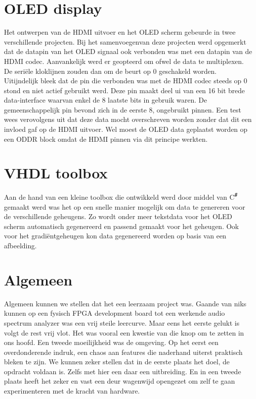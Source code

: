 	\section{OLED display}
		\par Het ontwerpen van de HDMI uitvoer en het OLED scherm gebeurde in twee verschillende projecten. Bij het samenvoegenvan deze projecten werd opgemerkt dat de datapin van het OLED signaal ook verbonden was met een datapin van de HDMI codec. Aanvankelijk werd er geopteerd om ofwel de data te multiplexen. De seri\"ele kloklijnen zouden dan om de beurt op 0 geschakeld worden. Uitijndelijk bleek dat de pin die verbonden was met de HDMI codec steeds op 0 stond en niet actief gebruikt werd. Deze pin maakt deel ui van een 16 bit brede data-interface waarvan enkel de 8 laatste bits in gebruik waren. De gemeenschappelijk pin bevond zich in de eerste 8, ongebruikt pinnen. Een test wees verovolgens uit dat deze data mocht overschreven worden zonder dat dit een invloed gaf op de HDMI uitvoer. Wel moest de OLED data geplaatst worden op een ODDR block omdat de HDMI pinnen via dit principe werkten. 

	\section{VHDL toolbox}
		\par Aan de hand van een kleine toolbox die ontwikkeld werd door middel van C\textsuperscript{\texttt{\#}} gemaakt werd was het op een snelle manier mogelijk om data te genereren voor de verschillende geheugens. Zo wordt onder meer tekstdata voor het OLED scherm automatisch gegenereerd en passend gemaakt voor het geheugen. Ook voor het gradi\"entgeheugen kon data gegenereerd worden op basis van een afbeelding.

	\section{Algemeen}
		\par Algemeen kunnen we stellen dat het een leerzaam project was. Gaande van niks kunnen op een fysisch FPGA development board tot een werkende audio spectrum analyzer was een vrij steile leercurve. Maar eens het eerste gelukt is volgt de rest vrij vlot. Het was vooral een kwestie van die knop om te zetten in ons hoofd. Een tweede moeilijkheid was de omgeving. Op het eerst een overdonderende indruk, een chaos aan features die naderhand uiterst praktisch bleken te zijn. We kunnen zeker stellen dat in de eerste plaats het doel, de opdracht voldaan is. Zelfs met hier een daar een uitbreiding. En in een tweede plaats heeft het zeker en vast een deur wagenwijd opengezet om zelf te gaan experimenteren met de kracht van hardware.